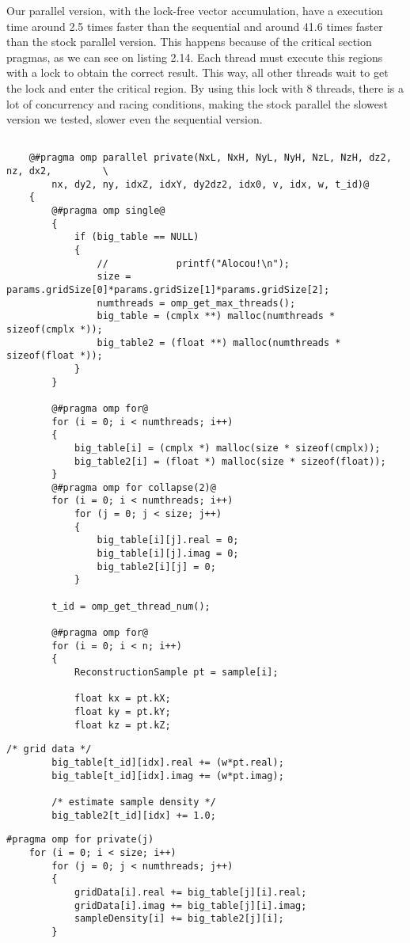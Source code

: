 \documentclass[10pt,a4paper]{report}
\begin{document}
Our parallel version, with the lock-free vector accumulation, have a execution time around 2.5 times faster than the sequential and around 41.6 times faster than the stock parallel version. This happens because of the critical section pragmas, as we can see on listing 2.14. Each thread must execute this regions with a lock to obtain the correct result. This way, all other threads wait to get the lock and enter the critical region. By using this lock with 8 threads, there is a lot of concurrency and racing conditions, making the stock parallel the slowest version we tested, slower even the sequential version.\\

\newpage
\begin{center}
\begin{lstlisting}[caption=Our parallel lock-free structure allocation for mri-gridding,style=base]

	@#pragma omp parallel private(NxL, NxH, NyL, NyH, NzL, NzH, dz2, nz, dx2,         \
		nx, dy2, ny, idxZ, idxY, dy2dz2, idx0, v, idx, w, t_id)@
	{
		@#pragma omp single@
		{
			if (big_table == NULL)
			{
				//			  printf("Alocou!\n");
				size = params.gridSize[0]*params.gridSize[1]*params.gridSize[2];
				numthreads = omp_get_max_threads();	  
				big_table = (cmplx **) malloc(numthreads * sizeof(cmplx *));
				big_table2 = (float **) malloc(numthreads * sizeof(float *));
			}
		}

		@#pragma omp for@
		for (i = 0; i < numthreads; i++)
		{
			big_table[i] = (cmplx *) malloc(size * sizeof(cmplx));
			big_table2[i] = (float *) malloc(size * sizeof(float));
		}
		@#pragma omp for collapse(2)@
		for (i = 0; i < numthreads; i++)
			for (j = 0; j < size; j++)
			{
				big_table[i][j].real = 0;
				big_table[i][j].imag = 0;
				big_table2[i][j] = 0;
			}

		t_id = omp_get_thread_num();

		@#pragma omp for@
		for (i = 0; i < n; i++)
		{
			ReconstructionSample pt = sample[i];

			float kx = pt.kX;
			float ky = pt.kY;
			float kz = pt.kZ;
\end{lstlisting}

\begin{lstlisting}[caption=Our parallel partial data processing code for mri-gridding,style=base]
		/* grid data */
		big_table[t_id][idx].real += (w*pt.real);
		big_table[t_id][idx].imag += (w*pt.imag);

		/* estimate sample density */
		big_table2[t_id][idx] += 1.0;		
\end{lstlisting}

\begin{lstlisting}[caption=Our parallel final data processing code for mri-gridding,style=base]
	#pragma omp for private(j)
	for (i = 0; i < size; i++)
		for (j = 0; j < numthreads; j++)
		{
			gridData[i].real += big_table[j][i].real;
			gridData[i].imag += big_table[j][i].imag;
			sampleDensity[i] += big_table2[j][i];
		}
\end{lstlisting}


\end{center}
\end{document}
